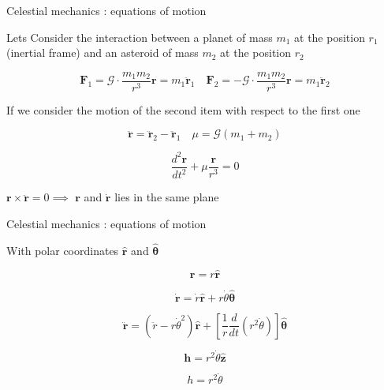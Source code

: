 \documentclass{beamer}
\begin{document}
\begin{frame}{Celestial mechanics \cite{murray1999solar}: equations of motion}

\begin{center}
Lets Consider the interaction between a planet of mass $m_{1}$ at the  position $r_{1}$ (inertial frame) and an asteroid of mass $m_{2}$  at the position $r_{2}$
\end{center}


\begin{equation}
\textbf{F}_{1}=\mathcal{G} \cdot \frac{m_{1}m_{2}}{r^{3}}\textbf{r}=m_{1} \ddot{\textbf{r}}_{1}\quad \textbf{F}_{2}=-\mathcal{G} \cdot \frac{m_{1}m_{2}}{r^{3}}\textbf{r}=m_{1} \ddot{\textbf{r}}_{2}
\end{equation}

 
If we consider the motion of the second item with respect to the first one 
 
\begin{equation}
\ddot{\textbf{r}}=\ddot{\textbf{r}}_{2}-\ddot{\textbf{r}}_{1} \quad \mu=\mathcal{G}(m_{1}+m_{2})
\end{equation}

\begin{equation}
\dfrac{d^{2}\textbf{r}}{dt^{2}}+\mu\dfrac{\textbf{r}}{r^{3}}=0
\end{equation}

\begin{center}
$\textbf{r} \times \ddot{ \textbf{r}}=0  \implies $ $\textbf{r}$  and $\dot{\textbf{r}}$ lies in the same plane

\end{center}
\end{frame}

\begin{frame}{Celestial mechanics \cite{murray1999solar}: equations of motion}
\begin{center}
With polar coordinates  $\hat{\textbf{r}}$ and $\hat{\boldsymbol{\theta}}$
\end{center}
\begin{equation}
\textbf{r}=r\hat{\textbf{r}}
\end{equation}

\begin{equation}
\dot{\textbf{r}}=\dot{r}\hat{\textbf{r}}+r\dot{\theta}\hat{\boldsymbol{\theta}}
\label{eq_dyn_nop}
\end{equation}

\begin{equation}
\ddot{\textbf{r}}=\left(\ddot{r}-r\dot{\theta}^{2}\right)\hat{\textbf{r}}+\left[\dfrac{1}{r}\frac{d}{dt}\left(r^{2}\dot{\theta}\right)\right]\hat{\boldsymbol{\theta}}
\end{equation}

\begin{equation}
\textbf{h}=r^{2}\dot{\theta}\hat{\textbf{z}}
\end{equation}


\begin{equation}
h=r^{2}\dot{\theta}
\end{equation}

\end{frame}
\end{document}
